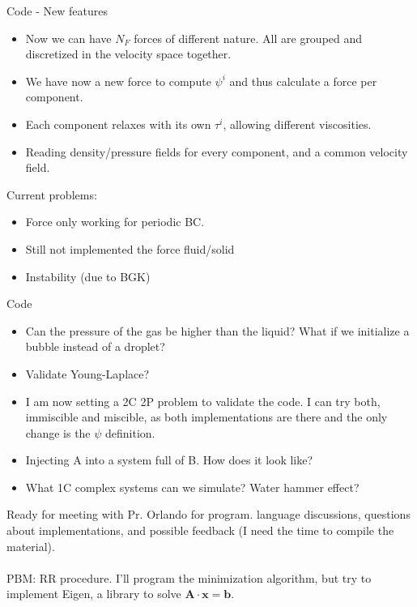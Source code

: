 \documentclass{beamer}
\begin{document}
	\begin{frame}{Code - New features}
		\begin{itemize}
			\item Now we can have $N_F$ forces of different nature. All are grouped and discretized in the velocity space together.
			\item We have now a new force to compute $\psi^i$ and thus calculate a force per component.
			\item Each component relaxes with its own $\tau^i$, allowing different viscosities.
			\item Reading density/pressure fields for every component, and a common velocity field.
		\end{itemize}
		Current problems:
		\begin{itemize}
			\item Force only working for periodic BC.
			\item Still not implemented the force fluid/solid
			\item Instability (due to BGK)
		\end{itemize}
		 
	\end{frame}
	
	\begin{frame}{Code}
		\begin{itemize}
		\item Can the pressure of the gas be higher than the liquid? What if we initialize a bubble instead of a droplet?
		\item Validate Young-Laplace?
		\item I am now setting a 2C 2P problem to validate the code. I can try both, immiscible and miscible, as both implementations are there and the only change is the $\psi$ definition.
		\item Injecting A into a system full of B. How does it look like?
		\item What 1C complex systems can we simulate? Water hammer effect?
		\end{itemize}
		Ready for meeting with Pr. Orlando for program. language discussions, questions about implementations, and possible feedback (I need the time to compile the material).\\~\\
		
		PBM: RR procedure. I'll program the minimization algorithm, but try to implement Eigen, a library to solve $\mathbf{A \cdot x} = \mathbf{b}$.
	\end{frame}
	
\end{document}

